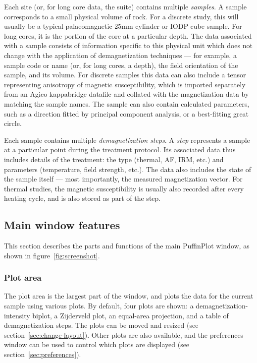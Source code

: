 \documentclass[a4paper,british]{article}
\begin{document}
Each site (or, for long core data, the suite) contains multiple
\emph{samples}. A sample corresponds to a small physical volume of rock.
For a discrete study, this will usually be a typical palaeomagnetic 25mm
cylinder or IODP cube sample. For long cores, it is the portion of the
core at a particular depth. The data associated with a sample consists
of information specific to this physical unit which does not change with
the application of demagnetization techniques --- for example, a sample
code or name (or, for long cores, a depth), the field orientation of the
sample, and its volume. For discrete samples this data can also include
a tensor representing anisotropy of magnetic susceptibility, which is
imported separately from an Agico kappabridge datafile and collated with
the magnetization data by matching the sample names. The sample can also
contain calculated parameters, such as a direction fitted by principal
component analysis, or a best-fitting great circle.

Each sample contains multiple \emph{demagnetization steps}. A
\emph{step} represents a sample at a particular point during the
treatment protocol. Its associated data thus includes details of the
treatment: the type (thermal, AF, IRM, etc.) and parameters
(temperature, field strength, etc.). The data also includes the state of
the sample itself --- most importantly, the measured magnetization
vector. For thermal studies, the magnetic susceptibility is usually also
recorded after every heating cycle, and is also stored as part of the
step.

\subsection{Main window features}

This section describes the parts and functions of the main PuffinPlot
window, as shown in figure~\ref{fig:screenshot}.

\subsubsection{Plot area}

The plot area is the largest part of the window, and plots the data for the
current sample using various plots. By default, four plots are shown: a
demagnetization-intensity biplot, a Zijderveld plot, an equal-area
projection, and a table of demagnetization steps. The plots can be moved and
resized (see section~\ref{sec:change-layout}). Other plots are also
available, and the preferences window can be used to control which plots are
displayed (see section~\ref{sec:preferences}).
\end{document}

